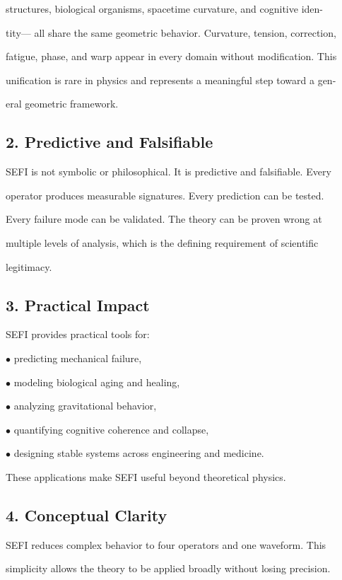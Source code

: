 \documentclass[10pt]{article}
\begin{document}
structures, biological organisms, spacetime curvature, and cognitive iden-

tity--- all share the same geometric behavior. Curvature, tension, correction,

fatigue, phase, and warp appear in every domain without modification. This

unification is rare in physics and represents a meaningful step toward a gen-

eral geometric framework.

\subsection*{2. Predictive and Falsifiable}
SEFI is not symbolic or philosophical. It is predictive and falsifiable. Every

operator produces measurable signatures. Every prediction can be tested.

Every failure mode can be validated. The theory can be proven wrong at

multiple levels of analysis, which is the defining requirement of scientific

legitimacy.

\subsection*{3. Practical Impact}
SEFI provides practical tools for:

\noindent $\bullet$ predicting mechanical failure,


\noindent $\bullet$ modeling biological aging and healing,

\noindent $\bullet$ analyzing gravitational behavior,

\noindent $\bullet$ quantifying cognitive coherence and collapse,

\noindent $\bullet$ designing stable systems across engineering and medicine.

These applications make SEFI useful beyond theoretical physics.

\subsection*{4. Conceptual Clarity}
SEFI reduces complex behavior to four operators and one waveform. This

simplicity allows the theory to be applied broadly without losing precision.
\end{document}
